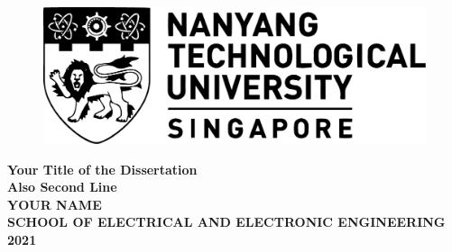 \begin{titlepage}

\begin{figure}[h!]
\centering
\includegraphics[width=1\textwidth]{Title/NTU-LOGO-bw.pdf}
\caption*{}
\label{fig:entropy} 
\end{figure}

\vspace{1.5in}

\centering
\Huge{\textbf{Your Title of the Dissertation\\Also Second Line}}\\[2.5in]

\LARGE{\textbf{YOUR NAME}}\\[0.5in]

\normalsize{\textbf{SCHOOL OF ELECTRICAL AND ELECTRONIC ENGINEERING}}\\[0.2in]


\large{\textbf{2021}}
\end{titlepage}
\newpage